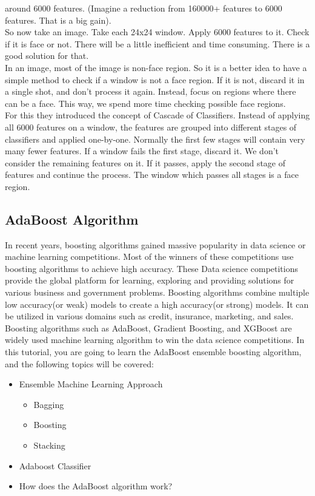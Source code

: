             around 6000 features. (Imagine a reduction from 160000+ features to 6000 features. That is a big gain). \\ 
            \vspace{3mm}
            So now take an image. Take each 24x24 window. Apply 6000 features to it. Check if it is face or not. There will be a little inefficient and time consuming. There is a good solution for that. \\ 
            \vspace{3mm}
            In an image, most of the image is non-face region. So it is a better idea to have a simple method to check if a window is not a face region. If it is not, discard it in a single shot, and don't process it again. Instead, focus on regions where there can be a face. This way, 
            we spend more time checking possible face regions. \\ 
            \vspace{3mm}
            For this they introduced the concept of Cascade of Classifiers. Instead of applying all 6000 features on a window, the features are grouped into different stages of classifiers and applied one-by-one. Normally the first few stages will contain very many fewer features. 
            If a window fails the first stage, discard it. We don't consider the remaining features on it. If it passes, apply the second stage of features and continue the process. The window which passes all stages is a face region.
    \subsection{AdaBoost Algorithm}
        In recent years, boosting algorithms gained massive popularity in data science or machine learning competitions. Most of the winners of these competitions use boosting algorithms to achieve high accuracy. These Data science competitions provide 
        the global platform for learning, exploring and providing solutions for various business and government problems. Boosting algorithms combine multiple low accuracy(or weak) models to create a high accuracy(or strong) models. It can be utilized in 
        various domains such as credit, insurance, marketing, and sales. Boosting algorithms such as AdaBoost, Gradient Boosting, and XGBoost are widely used machine learning algorithm to win the data science competitions. In this tutorial, you are going 
        to learn the AdaBoost ensemble boosting algorithm, and the following topics will be covered:
        \begin{itemize}
            \item Ensemble Machine Learning Approach
                \begin{itemize}
                    \item Bagging
                    \item Boosting
                    \item Stacking  
                \end{itemize}
            \item Adaboost Classifier
            \item How does the AdaBoost algorithm work?
        \end{itemize}
